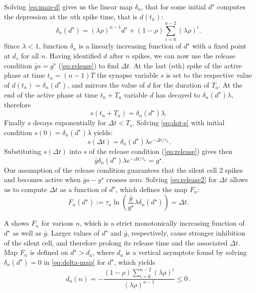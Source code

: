 \documentclass[utf8]{frontiersFPHY} %
\newcommand{\dn}{\delta_n}
\begin{document}
Solving \cref{eq:map-d} gives us the linear map $\delta_n$, that for some initial $d^\star$ computes the depression at the $n$th spike time, that is $d(t_n)$:
\begin{equation}
	\label{eq:delta-map}
	\delta_n(d^\star) = (\lambda \rho)^{n-1} d^\star + (1-\rho)\sum_{i=0}^{n-2}(\lambda \rho)^i.
\end{equation}
Since $\lambda < 1$, function $\delta_n$ is a linearly increasing function of $d^\star$ with a fixed point at $d_s$ for all $n$.
Having identified $d$ after $n$ spikes, we can now use the release condition $\bar g s = g^{\star}$ (\cref{eq:release}) to find $\Delta t$.
At the last ($n$th) spike of the active phase at time $t_n = (n-1)T$ the synapse variable $s$ is set to the respective value of $d(t_n) = \delta_n(d^\star)$, and mirrors the value of $d$ for the duration of $T_{a}$.
At the end of the active phase at time $t_n + T_{a}$ variable $d$ has decayed to $\delta_n(d^\star) \lambda$, therefore
\begin{equation}
	s(t_n + T_{a})=\delta_n(d^\star)\lambda.
\end{equation}
Finally $s$ decays exponentially for $\Delta t < T_{s}$.
Solving \cref{eq:dot-s} with initial condition $s(0)=\dn(d^\star)\lambda$ yields:
\begin{equation}
	~\label{eq:s-sol}
	s(\Delta t)=\dn(d^\star) \lambda e^{-\Delta t/\tau_\kappa}.
\end{equation}
Substituting $s(\Delta t)$ into $s$ of the release condition (\cref{eq:release}) gives then
\begin{equation}
	~\label{eq:release2}
	\bar g \dn(d^\star) \lambda e^{-\Delta t/\tau_\kappa}=g^{\star}.
\end{equation}
Our assumption of the release condition guarantees that the silent cell 2 spikes and becomes active when $\bar g s - g^{\star}$ crosses zero.
Solving \cref{eq:release2} for $\Delta t$ allows us to compute $\Delta t$ as a function of $d^{\star}$, which defines the map $F_{n}$:
\begin{equation}
	\label{eq:Fn-map}
	F_n(d^\star):=\tau_\kappa \ln{\left(\frac{\bar g }{g^\star} \lambda \delta_{n}(d^\star)\right)}= \Delta t.
\end{equation}

A shows $F_n$ for various $n$, which is a strict monotonically increasing function of $d^{\star}$ as well as $\bar g$.
Larger values of $d^{\star}$ and $\bar g$, respectively, cause stronger inhibition of the silent cell, and therefore prolong its release time and the associated $\Delta t$.
Map $F_n$ is defined on $d^{\star}>d_{a}$, where $d_{a}$ is a vertical asymptote found by solving $\delta_{n}(d^\star)=0$ in \cref{eq:delta-map} for $d^\star$, which yields
\begin{equation}
	d_{a}(n)=-\frac{(1-\rho)\sum_{i=0}^{n-2}(\lambda \rho)^{i}}{ (\lambda \rho)^{n-1} }\leq 0~\label{eq:da}.
\end{equation}
\end{document}
